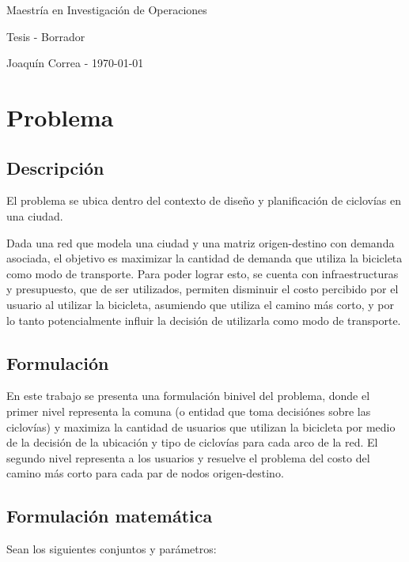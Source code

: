 \documentclass{article}
\begin{document}
  \begin{center}
    {\sc \large Maestría en Investigación de Operaciones}
    
    {\sc \large Tesis - Borrador}
    \linebreak

    {\rm Joaquín Correa - \today}
  \end{center}

  \section*{Problema}

  \subsection*{Descripción}

  El problema se ubica dentro del contexto de diseño y planificación de ciclovías en una ciudad.

  Dada una red que modela una ciudad y una matriz origen-destino con demanda asociada, el objetivo es maximizar la cantidad de demanda que utiliza la bicicleta como modo de transporte. Para poder lograr esto, se cuenta con infraestructuras y presupuesto, que de ser utilizados, permiten disminuir el costo percibido por el usuario al utilizar la bicicleta, asumiendo que utiliza el camino más corto, y por lo tanto potencialmente influir la decisión de utilizarla como modo de transporte.

  \subsection*{Formulación}

  En este trabajo se presenta una formulación binivel del problema, donde el primer nivel representa la comuna (o entidad que toma decisiónes sobre las ciclovías) y maximiza la cantidad de usuarios que utilizan la bicicleta por medio de la decisión de la ubicación y tipo de ciclovías para cada arco de la red. El segundo nivel representa a los usuarios y resuelve el problema del costo del camino más corto para cada par de nodos origen-destino.

  \subsection*{Formulación matemática}

  Sean los siguientes conjuntos y parámetros:
\end{document}
